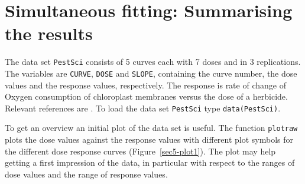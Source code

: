 \documentclass[a4paper]{article}
\begin{document}

\newpage
\section{Simultaneous fitting: Summarising the results} \label{sec:5}

The data set \verb+PestSci+ consists of 5 curves each with 7 doses and in 3 replications. The variables are \verb+CURVE+, \verb+DOSE+ and \verb+SLOPE+, 
containing the curve number, the dose values and the response values, respectively. The response is 
rate of change of Oxygen consumption of chloroplast membranes versus the dose of a herbicide. 
Relevant references are \citet{streibig&dayan&rimando&duke:1999, nielsen&ritz&streibig:2004}. To load the data set \verb+PestSci+ 
type \verb+data(PestSci)+.

To get an overview an initial plot of the data set is useful. The function \verb+plotraw+ plots the dose values against the response values with
different plot symbols for the different dose response curves (Figure~\ref{sec5-plot1}). The plot may help getting a first impression of the data,
in particular with respect to the ranges of dose values and the range of response values.
\end{document}
